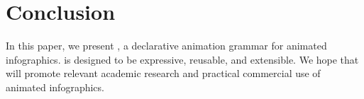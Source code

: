 \section{Conclusion}
\label{sec:conclusion}

In this paper, we present \gaia{}, a declarative animation grammar for animated infographics.
\gaia{} is designed to be expressive, reusable, and extensible.
We hope that \gaia{} will promote relevant academic research and practical commercial use of animated infographics.
 